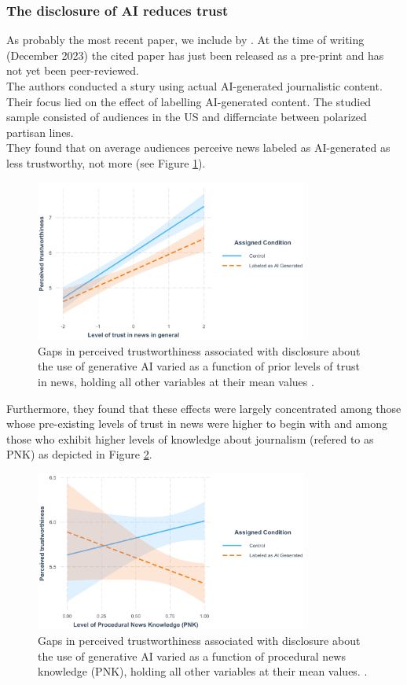 \documentclass[
  a4paper,  %
  twoside,  %
  bibliography=totoc,
  headsepline,
  cleardoublepage=empty,
  parskip=half,
  draft=false
]{scrbook}
\begin{document}
\subsubsection*{The disclosure of AI reduces trust}
As probably the most recent paper, we include  by \citeauthor{toffTheyCouldJust2023}. At the time of writing (December 2023) the cited paper has just been released as a pre-print and has not yet been peer-reviewed. \\
The authors conducted a stury using actual AI-generated journalistic content. Their focus lied on the effect of labelling AI-generated content. The studied sample consisted of audiences in the US and differnciate between polarized partisan lines. \\
They found that on average audiences perceive news labeled as AI-generated as less trustworthy, not more (see Figure \ref{fig:toff-trust}). 
\begin{figure}[h]
  \centering
  \includegraphics[width=0.8\textwidth]{./graphics/toff/Trust in news.png}
  \caption{Gaps in perceived trustworthiness associated with disclosure about the use of generative AI varied as a function of prior levels of trust in news, holding all other variables at their mean values \cite{toffTheyCouldJust2023}.}
  \label{fig:toff-trust}
\end{figure}
Furthermore, they found that these effects were largely concentrated among those whose pre-existing levels of trust in news were higher to begin with and among those who exhibit higher levels of knowledge about journalism (refered to as PNK) as depicted in Figure \ref{fig:toff-PNK}.
\begin{figure}[h]
  \centering
  \includegraphics[width=0.8\textwidth]{./graphics/toff/PNK.png}
  \caption{Gaps in perceived trustworthiness associated with disclosure about the use of generative AI varied as a function of procedural news knowledge (PNK), holding all other variables at their mean values. \cite{toffTheyCouldJust2023}.}
  \label{fig:toff-PNK}
\end{figure}
\end{document}
